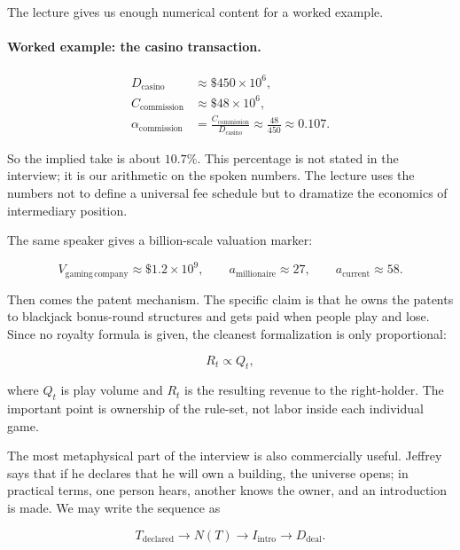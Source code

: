 The lecture gives us enough numerical content for a worked example.

\paragraph{Worked example: the casino transaction.}
\begin{align}
D_{\mathrm{casino}} &\approx \$450\times 10^6, \\
C_{\mathrm{commission}} &\approx \$48\times 10^6, \\
\alpha_{\mathrm{commission}}
&=
\frac{C_{\mathrm{commission}}}{D_{\mathrm{casino}}}
\approx
\frac{48}{450}
\approx
0.107.
\end{align}

So the implied take is about \(10.7\%\). This percentage is not stated in the interview; it is our arithmetic on the spoken numbers. The lecture uses the numbers not to define a universal fee schedule but to dramatize the economics of intermediary position.

The same speaker gives a billion-scale valuation marker:

\begin{equation}
V_{\mathrm{gaming\,company}} \approx \$1.2\times 10^9,
\qquad
a_{\mathrm{millionaire}} \approx 27,
\qquad
a_{\mathrm{current}} \approx 58.
\end{equation}

Then comes the patent mechanism. The specific claim is that he owns the patents to blackjack bonus-round structures and gets paid when people play and lose. Since no royalty formula is given, the cleanest formalization is only proportional:

\begin{equation}
R_t \propto Q_t,
\end{equation}

where \(Q_t\) is play volume and \(R_t\) is the resulting revenue to the right-holder. The important point is ownership of the rule-set, not labor inside each individual game.

The most metaphysical part of the interview is also commercially useful. Jeffrey says that if he declares that he will own a building, the universe opens; in practical terms, one person hears, another knows the owner, and an introduction is made. We may write the sequence as

\begin{equation}
T_{\mathrm{declared}} \to N(T) \to I_{\mathrm{intro}} \to D_{\mathrm{deal}}.
\end{equation}


